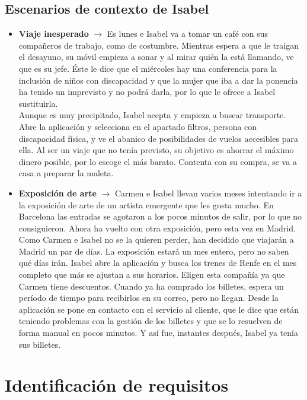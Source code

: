 \subsection{Escenarios de contexto de Isabel}
\begin{itemize}
    \item \textbf{Viaje inesperado} $\rightarrow$ Es lunes e Isabel va a tomar un café con sus compañeros de trabajo, como de costumbre. Mientras espera a 
    que le traigan el desayuno, su móvil empieza a sonar y al mirar quién la está llamando, ve que es su jefe. Éste le dice que el miércoles hay una conferencia 
    para la inclusión de niños con discapacidad y que la mujer que iba a dar la ponencia ha tenido un imprevisto y no podrá darla, por lo que le ofrece a Isabel 
    sustituirla. \\

    Aunque es muy precipitado, Isabel acepta y empieza a buscar transporte. Abre la aplicación y selecciona en el apartado filtros, persona con discapacidad 
    física, y ve el abanico de posibilidades de vuelos accesibles para ella. Al ser un viaje que no tenía previsto, su objetivo es ahorrar el máximo dinero 
    posible, por lo escoge el más barato. Contenta con su compra, se va a casa a preparar la maleta.
    \item \textbf{Exposición de arte} $\rightarrow$ Carmen e Isabel llevan varios meses intentando ir a la exposición de arte de un artista emergente que les 
    gusta mucho. En Barcelona las entradas se agotaron a los pocos minutos de salir, por lo que no consiguieron. Ahora ha vuelto con otra exposición, pero esta 
    vez en Madrid. \\

    Como Carmen e Isabel no se la quieren perder, han decidido que viajarán a Madrid un par de días. La exposición estará un mes entero, pero no saben qué días irán.
    Isabel abre la aplicación y busca los trenes de Renfe en el mes completo que más se ajustan a sus horarios. Eligen esta compañía ya que Carmen tiene 
    descuentos. Cuando ya ha comprado los billetes, espera un período de tiempo para recibirlos en su correo, pero no llegan. Desde la aplicación se pone en contacto 
    con el servicio al cliente, que le dice que están teniendo problemas con la gestión de los billetes y que se lo resuelven de forma manual en pocos minutos. Y así 
    fue, instantes después, Isabel ya tenía sus billetes.
\end{itemize}

\section{Identificación de requisitos}

